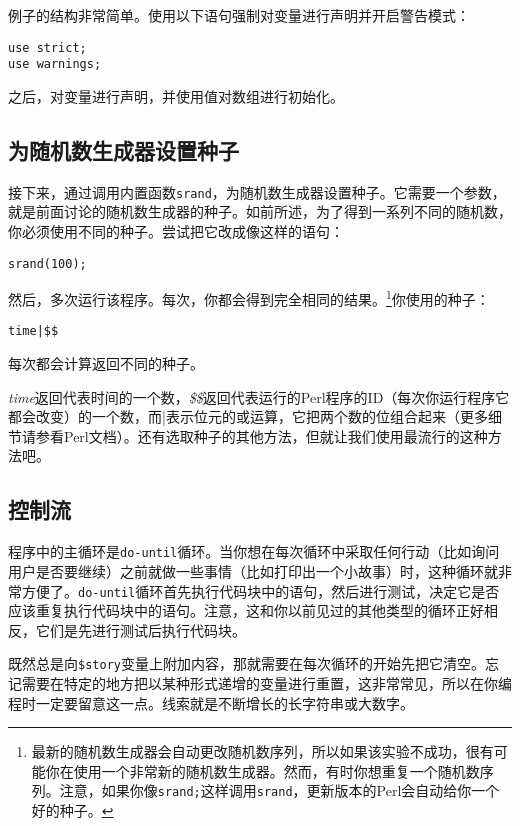 例子的结构非常简单。使用以下语句强制对变量进行声明并开启警告模式：

\begin{lstlisting}
use strict;
use warnings;
\end{lstlisting}

之后，对变量进行声明，并使用值对数组进行初始化。

\subsection{为随机数生成器设置种子} 
接下来，通过调用内置函数\verb|srand|，为随机数生成器设置种子。它需要一个参数，就是前面讨论的随机数生成器的种子。如前所述，为了得到一系列不同的随机数，你必须使用不同的种子。尝试把它改成像这样的语句：

\begin{lstlisting}
srand(100);
\end{lstlisting}

然后，多次运行该程序。每次，你都会得到完全相同的结果。\footnote{最新的随机数生成器会自动更改随机数序列，所以如果该实验不成功，很有可能你在使用一个非常新的随机数生成器。然而，有时你想重复一个随机数序列。注意，如果你像\verb|srand;|这样调用\verb|srand|，更新版本的Perl会自动给你一个好的种子。}你使用的种子：

\begin{lstlisting}
time|$$ 
\end{lstlisting}

每次都会计算返回不同的种子。

\textit{time}返回代表时间的一个数，\textit{\$\$}返回代表运行的Perl程序的ID（每次你运行程序它都会改变）的一个数，而|表示位元的或运算，它把两个数的位组合起来（更多细节请参看Perl文档）。还有选取种子的其他方法，但就让我们使用最流行的这种方法吧。

\subsection{控制流}
程序中的主循环是\verb|do-until|循环。当你想在每次循环中采取任何行动（比如询问用户是否要继续）之前就做一些事情（比如打印出一个小故事）时，这种循环就非常方便了。\verb|do-until|循环首先执行代码块中的语句，然后进行测试，决定它是否应该重复执行代码块中的语句。注意，这和你以前见过的其他类型的循环正好相反，它们是先进行测试后执行代码块。

既然总是向\verb|$story|变量上附加内容，那就需要在每次循环的开始先把它清空。忘记需要在特定的地方把以某种形式递增的变量进行重置，这非常常见，所以在你编程时一定要留意这一点。线索就是不断增长的长字符串或大数字。

